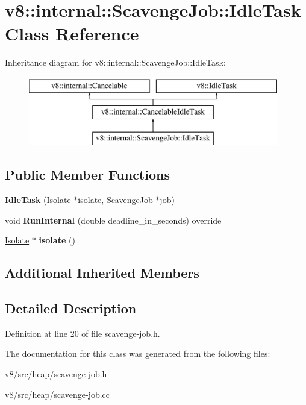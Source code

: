 \hypertarget{classv8_1_1internal_1_1ScavengeJob_1_1IdleTask}{}\section{v8\+:\+:internal\+:\+:Scavenge\+Job\+:\+:Idle\+Task Class Reference}
\label{classv8_1_1internal_1_1ScavengeJob_1_1IdleTask}
Inheritance diagram for v8\+:\+:internal\+:\+:Scavenge\+Job\+:\+:Idle\+Task\+:\begin{figure}[H]
\begin{center}
\leavevmode
\includegraphics[height=3.000000cm]{classv8_1_1internal_1_1ScavengeJob_1_1IdleTask}
\end{center}
\end{figure}
\subsection*{Public Member Functions}
\begin{DoxyCompactItemize}
\item 
\mbox{\label{classv8_1_1internal_1_1ScavengeJob_1_1IdleTask_a7ac8fdec66bd1d9c33b23eac199990e0}} 
{\bfseries Idle\+Task} (\mbox{\hyperlink{classv8_1_1internal_1_1Isolate}{Isolate}} $\ast$isolate, \mbox{\hyperlink{classv8_1_1internal_1_1ScavengeJob}{Scavenge\+Job}} $\ast$job)
\item 
\mbox{\label{classv8_1_1internal_1_1ScavengeJob_1_1IdleTask_a8f2e8b5b8a25e35eeadfc61c55bbf29e}} 
void {\bfseries Run\+Internal} (double deadline\+\_\+in\+\_\+seconds) override
\item 
\mbox{\label{classv8_1_1internal_1_1ScavengeJob_1_1IdleTask_a77912867cd009e4874e256c4284dd511}} 
\mbox{\hyperlink{classv8_1_1internal_1_1Isolate}{Isolate}} $\ast$ {\bfseries isolate} ()
\end{DoxyCompactItemize}
\subsection*{Additional Inherited Members}


\subsection{Detailed Description}


Definition at line 20 of file scavenge-\/job.\+h.



The documentation for this class was generated from the following files\+:\begin{DoxyCompactItemize}
\item 
v8/src/heap/scavenge-\/job.\+h\item 
v8/src/heap/scavenge-\/job.\+cc\end{DoxyCompactItemize}
